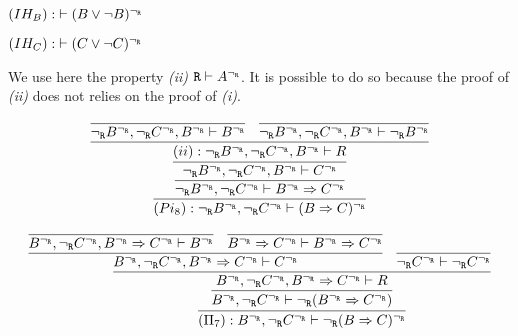 \begin{enumerate}[(i)]
\begin{itemize}
            $(IH_B) : \; \vdash (B \vee \neg B)^{\neg_{\texttt{R}}}$
            
            $(IH_C) : \; \vdash (C \vee \neg C)^{\neg_{\texttt{R}}}$
            
            We use here the property \textit{(ii)} $\texttt{R} \vdash A^{\neg_{\texttt{R}}}$. It is possible to do so because the proof of \textit{(ii)} does not relies on the proof of \textit{(i)}.
            
            $$
            \infer{
                 (Pi_8): \ngr B^\ngr, \ngr C^\ngr \vdash (B \Rightarrow C)^\ngr
            }{
                 \infer{
                     \ngr B^\ngr, \ngr C^\ngr \vdash B^\ngr \Rightarrow C^\ngr
                }{
                    \infer{
                        \ngr B^\ngr, \ngr C^\ngr, B^\ngr \vdash C^\ngr
                    }{
                        \infer{
                            (ii): \ngr B^\ngr, \ngr C^\ngr, B^\ngr \vdash R
                        }{
                            \infer{
                                \ngr B^\ngr, \ngr C^\ngr, B^\ngr \vdash B^\ngr
                            }{
                            }
                            &
                            \infer{
                                \ngr B^\ngr, \ngr C^\ngr, B^\ngr \vdash \ngr B^\ngr
                            }{
                            }
                        }
                    }
                }
            }
            $$
            
            $$
            \infer{
                 (\Pi_7): B^\ngr, \ngr C^\ngr \vdash \ngr (B \Rightarrow C)^\ngr
                }{
                    \infer{
                        B^\ngr, \ngr C^\ngr \vdash \ngr (B^\ngr \Rightarrow C^\ngr)
                    }{
                        \infer{
                            B^\ngr, \ngr C^\ngr, B^\ngr \Rightarrow C^\ngr \vdash R
                        }{
                            \infer{
                                B^\ngr, \ngr C^\ngr, B^\ngr \Rightarrow C^\ngr \vdash C^\ngr
                            }{
                                \infer{
                                    B^\ngr, \ngr C^\ngr, B^\ngr \Rightarrow C^\ngr \vdash B^\ngr
                                }{
                                }
                                &
                                \infer{
                                    B^\ngr \Rightarrow C^\ngr \vdash  B^\ngr \Rightarrow C^\ngr
                                }{
                                }
                            }
                            &
                            \infer{
                                \ngr C^\ngr \vdash \ngr C^\ngr
                            }{
                            }
                        }
                    }
                }
            $$
            

\end{itemize}
\end{enumerate}
